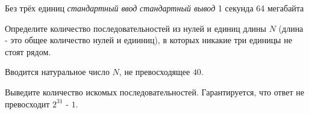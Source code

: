 \begin{problem}%
{Без трёх единиц}%
{\textsl{стандартный ввод}}%
{\textsl{стандартный вывод}}%
{1 секунда}%
{64 мегабайта}{}

Определите количество последовательностей из нулей и единиц длины $N$ (длина - это общее количество нулей и едииниц), в которых никакие три единицы не стоят рядом.

\InputFile

Вводится натуральное число $N$, не превосходящее $40$.

\OutputFile

Выведите количество искомых последовательностей. Гарантируется, что ответ не превосходит $2^{31}$ - $1$.

\Examples

\begin{example}
%
\end{example}
\end{problem}